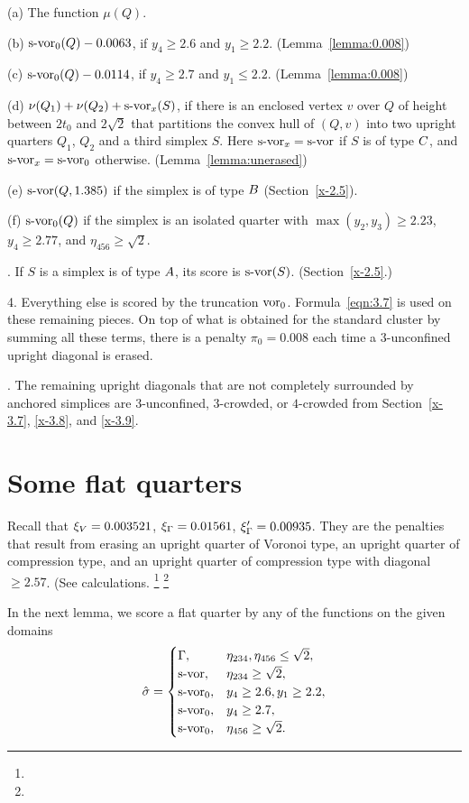 (a)  The function $\mu(Q)$.

(b)  $\operatorname{s-vor}_0(Q) - 0.0063$, if $y_4\ge 2.6$ and $y_1\ge
2.2$.\hfill
    (Lemma~\ref{lemma:0.008})

(c)  $\operatorname{s-vor}_0(Q) - 0.0114$, if $y_4\ge 2.7$ and $y_1\le 2.2$.
    \hfill (Lemma~\ref{lemma:0.008})

(d)  $\nu(Q_1)+\nu(Q_2)+\operatorname{s-vor}_x(S)$, if there is an enclosed
vertex
    $v$ over $Q$ of height between $2t_0$ and $2\sqrt{2}$ that
    partitions the convex hull of $(Q,v)$ into two upright quarters
    $Q_1$, $Q_2$ and a third simplex $S$. Here $\operatorname{s-vor}_x=\operatorname{s-vor}$
    if $S$ is of type $C$, and $\operatorname{s-vor}_x=\operatorname{s-vor}_0$ otherwise.
    \hfill (Lemma~\ref{lemma:unerased})

(e)  $\operatorname{s-vor}(Q,1.385)$ if the simplex is of type $B$
(Section~\ref{x-2.5}).

(f) $\operatorname{s-vor}_0(Q)$ if the simplex is an isolated quarter with
    $\max(y_2,y_3)\ge2.23$, $y_4\ge2.77$,
    and $\eta_{456}\ge\sqrt2$.

.   If $S$ is a simplex is of type $A$, its score is
$\operatorname{s-vor}(S)$. (Section~\ref{x-2.5}.)

\smallskip

4.  Everything else is scored by the truncation $\operatorname{vor}_0$.
    Formula~\ref{eqn:3.7} is used on these remaining pieces.
    On top of what is obtained for the standard cluster by summing all
these terms, there is a penalty $\pi_0=0.008$ each time a
$3$-unconfined upright diagonal is erased.

.  The remaining upright diagonals that are not completely
surrounded by anchored simplices are $3$-unconfined, $3$-crowded,
or $4$-crowded from Section~\ref{x-3.7}, \ref{x-3.8},  and
\ref{x-3.9}.

\section{Some flat quarters}
    \label{sec:some-flat}


Recall that $\xi_V=0.003521$, $\xi_\Gamma=0.01561$, $\xi_\Gamma'=0.00935$. They are
the penalties that result from erasing an upright quarter of Voronoi
type, an upright quarter of compression type, and an upright quarter of
compression type with diagonal $\ge2.57$. (See calculations.%
\footnote{} %
\footnote{} %

In the next lemma, we score a flat quarter by any of the functions
on the given domains
     $$\hat\sigma=
        \begin{cases}
            \Gamma,& \eta_{234},\eta_{456}\le\sqrt2,\\
             \operatorname{s-vor}, &\eta_{234}\ge\sqrt2,\\
            \operatorname{s-vor}_0, & y_4\ge 2.6, y_1\ge2.2,\\
            \operatorname{s-vor}_0, & y_4\ge 2.7,\\
            \operatorname{s-vor}_0,& \eta_{456}\ge\sqrt2.
        \end{cases}
    $$


